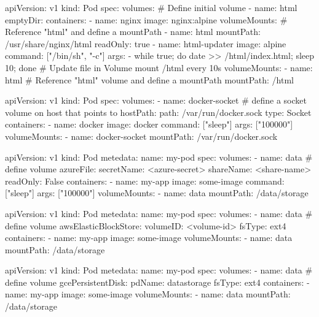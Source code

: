 \documentclass{refcard}
\begin{document}
\begin{yamlbox}[title={Defining an emptyDir Volume}]
apiVersion: v1
kind: Pod
spec:
  volumes: # Define initial volume
    - name: html
      emptyDir: {}
  containers:
  - name: nginx
    image: nginx:alpine
    volumeMounts: # Reference "html" and define a mountPath
      - name: html
        mountPath: /usr/share/nginx/html
        readOnly: true
  - name: html-updater
    image: alpine
    command: ["/bin/sh", "-c"]
    args:
      - while true; do date >> /html/index.html;
          sleep 10; done  # Update file in Volume mount /html every 10s
    volumeMounts: 
      - name: html # Reference "html" volume and define a mountPath
        mountPath: /html
\end{yamlbox}

\begin{yamlbox}[title={Defining a hostPath Volume}]
  apiVersion: v1
  kind: Pod
  spec:
    volumes:
      - name: docker-socket # define a socket volume on host that points to
        hostPath:
          path: /var/run/docker.sock
          type: Socket
    containers:
    - name: docker
      image: docker
      command: ["sleep"]
      args: ["100000"]
      volumeMounts:
        - name: docker-socket
          mountPath: /var/run/docker.sock
\end{yamlbox}

\begin{yamlbox}[title={Defining an Azure File Volume}]
  apiVersion: v1
  kind: Pod
  metedata:
    name: my-pod
  spec:
    volumes:
      - name: data # define volume
        azureFile:
          secretName: <azure-secret>
          shareName: <share-name>
          readOnly: False
    containers:
    - name: my-app
      image: some-image
      command: ["sleep"]
      args: ["100000"]
      volumeMounts:
        - name: data
          mountPath: /data/storage
\end{yamlbox}

\begin{yamlbox}[title={Defining an AWS Volume}]
  apiVersion: v1
  kind: Pod
  metedata:
    name: my-pod
  spec:
    volumes:
      - name: data # define volume
        awsElasticBlockStore:
          volumeID: <volume-id>
          fsType: ext4
    containers:
    - name: my-app
      image: some-image
      volumeMounts:
        - name: data
          mountPath: /data/storage
\end{yamlbox}

\begin{yamlbox}[title={Defining a Google Cloud GCE Volume}]
  apiVersion: v1
  kind: Pod
  metedata:
    name: my-pod
  spec:
    volumes:
      - name: data # define volume
        gcePersistentDisk:
          pdName: datastorage
          fsType: ext4
    containers:
    - name: my-app
      image: some-image
      volumeMounts:
        - name: data
          mountPath: /data/storage
\end{yamlbox}
\end{document}
